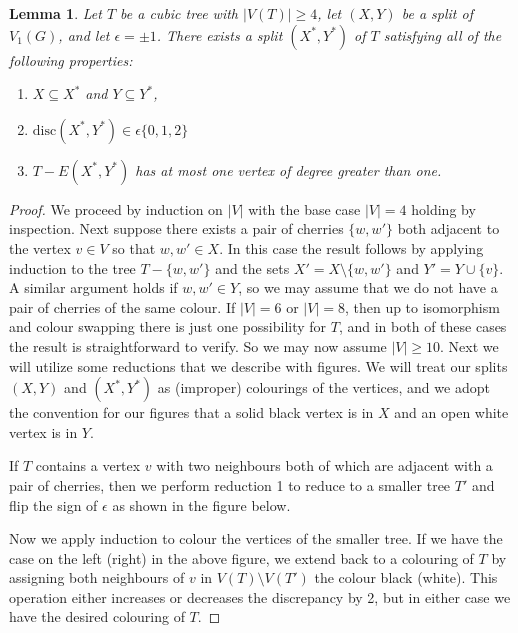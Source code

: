\documentclass[10pt,a4paper]{amsart}
\newtheorem{lemma}{Lemma}
\begin{document}
\begin{lemma}
\label{unrootedlemma}
Let $T$ be a cubic tree with $|V(T)| \ge 4$, let $(X,Y)$ be a split of $V_1(G)$, and let $\epsilon = \pm 1$.  There exists a split $(X^*,Y^*)$ of $T$ satisfying all of the following properties:
\begin{enumerate}
\item $X \subseteq X^*$ and $Y \subseteq Y^*$,
\item $\mathrm{disc}(X^*,Y^*) \in \epsilon \{0,1,2\}$
\item $T - E(X^*,Y^*)$ has at most one vertex of degree greater than one.
\end{enumerate}
\end{lemma}

\begin{proof}
We proceed by induction on $|V|$ with the base case $|V| =4$ holding by inspection.  Next suppose there exists a pair of cherries $\{w,w'\}$ both adjacent to the vertex $v \in V$ so that $w,w' \in X$.  In this case the result follows by applying induction to the tree $T - \{w,w'\}$ and the sets $X' = X \setminus \{w,w'\}$ and $Y' = Y \cup \{v\}$.  A similar argument holds if $w,w' \in Y$, so we may assume that we do not have a pair of cherries of the same colour.  If $|V| = 6$ or $|V| = 8$, then up to isomorphism and colour swapping there is just one possibility for $T$, and in both of these cases the result is straightforward to verify.  So we may now assume $|V| \ge 10$.  Next we will utilize some reductions that we describe with figures.  We will treat our splits $(X,Y)$ and $(X^*,Y^*)$ as (improper) colourings of the vertices, and we adopt the convention for our figures that a solid black vertex is in $X$ and an open white vertex is in $Y$.  

\bigskip


If $T$ contains a vertex $v$ with two neighbours both of which are adjacent with a pair of cherries, then we perform reduction 1 to reduce to a smaller tree $T'$ and flip the sign of $\epsilon$ as shown in the figure below.

\begin{center}

\end{center}

Now we apply induction to colour the vertices of the smaller tree.  If we have the case on the left (right) in the above figure, we extend back to a colouring of $T$ by assigning both neighbours of $v$ in $V(T) \setminus V(T')$ the colour black (white).  This operation either increases or decreases the discrepancy by 2, but in either case we have the desired colouring of $T$.  



\end{proof}
\end{document}
